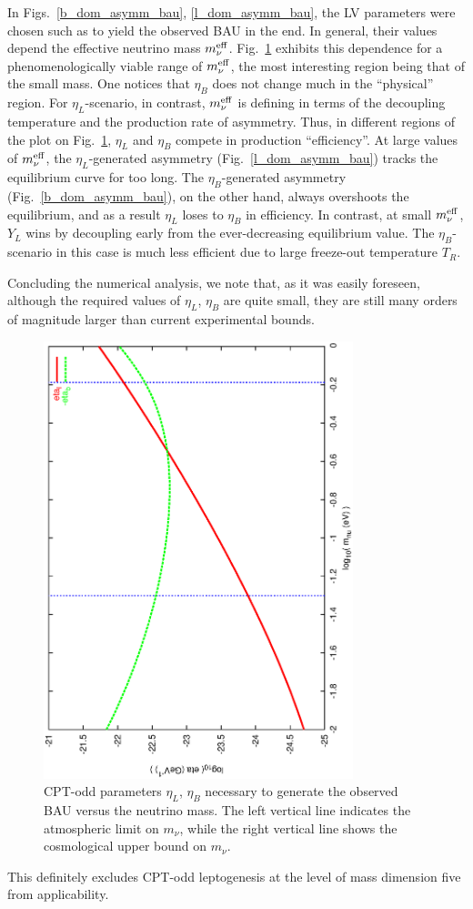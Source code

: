 \documentclass[12pt]{revtex4}
\newcommand{\meff}{m^{\rm eff}_\nu}
\begin{document}
	In Figs.~\ref{b_dom_asymm_bau}, \ref{l_dom_asymm_bau}, the LV parameters were
	chosen such as to yield the observed BAU in the end. 
	In general, their values depend 
	the effective neutrino mass $ \meff $.
	Fig.~\ref{scan_fig} exhibits this dependence for a phenomenologically
	viable range of $ \meff $, the most interesting region being that of
	the small mass.
	One notices that $ \eta_B $ does not change much in the ``physical'' region.
	For $ \eta_L $-scenario, in contrast, 
	$ \meff $ is defining in terms of the decoupling temperature
	and the production rate of asymmetry.
	Thus, in different regions of the plot on Fig.~\ref{scan_fig}, $ \eta_L $
	and $ \eta_B $ compete in production ``efficiency''.
	At large values of $ \meff $, the $ \eta_L $-generated asymmetry 
	(Fig.~\ref{l_dom_asymm_bau}) tracks the equilibrium curve for too long.
	The $ \eta_B $-generated asymmetry 
	(Fig.~\ref{b_dom_asymm_bau}), on the other hand, 
	always overshoots the equilibrium, and as a result $ \eta_L $ loses
	to $ \eta_B $ in efficiency.
	In contrast, at small $ \meff $, $ Y_L $ wins by decoupling early 
	from the ever-decreasing equilibrium value. 
	The $ \eta_B $-scenario in this case is much less efficient due to large
	freeze-out temperature $ T_R $.

	Concluding the numerical analysis, we note that, as it was easily foreseen, 
	although the required values of $ \eta_L $, $ \eta_B $ are quite
	small, they are still many orders of magnitude larger than
	current experimental bounds.
\begin{figure}
\includegraphics[width=9cm,angle=270]{scan_log.ps}
\caption{CPT-odd parameters $ \eta_L $, $ \eta_B $ necessary to generate
	the observed BAU versus the neutrino mass.
	The left vertical line indicates the atmospheric limit on $ m_\nu $,
	while the right vertical line shows the cosmological upper 
	bound on $ m_\nu $.}
\label{scan_fig}
\end{figure}
	This definitely excludes CPT-odd leptogenesis at the level of
	mass dimension five from applicability.
\end{document}

